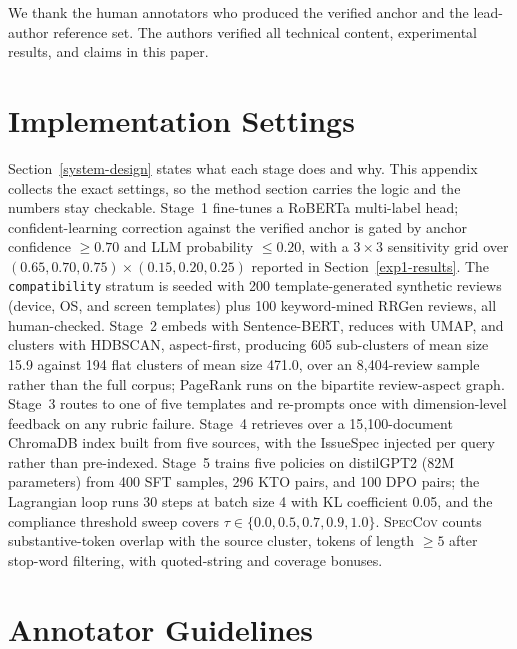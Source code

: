 \documentclass[sigconf, anonymous]{acmart}
\begin{document}
\begin{acks}
We thank the human annotators who produced the verified anchor and the lead-author reference set. The authors verified all technical content, experimental results, and claims in this paper.
\end{acks}



\appendix
  
  \section{Implementation Settings}\label{appendix:settings}

  Section~\ref{system-design} states what each stage does and why. This appendix collects the
  exact settings, so the method section carries the logic and the numbers stay checkable.
  Stage~1 fine-tunes a RoBERTa multi-label head; confident-learning correction against the
  verified anchor is gated by anchor confidence $\geq 0.70$ and LLM probability $\leq 0.20$,
  with a $3\times3$ sensitivity grid over $(0.65, 0.70, 0.75) \times (0.15, 0.20, 0.25)$
  reported in Section~\ref{exp1-results}. The \texttt{compatibility} stratum is seeded with 200
  template-generated synthetic reviews (device, OS, and screen templates) plus 100 keyword-mined
  RRGen reviews, all human-checked. Stage~2 embeds with Sentence-BERT, reduces with UMAP, and
  clusters with HDBSCAN, aspect-first, producing 605 sub-clusters of mean size 15.9 against 194
  flat clusters of mean size 471.0, over an 8{,}404-review sample rather than the full corpus; PageRank runs on the bipartite review-aspect graph. Stage~3
  routes to one of five templates and re-prompts once with dimension-level feedback on any
  rubric failure. Stage~4 retrieves over a 15{,}100-document ChromaDB index built from five
  sources, with the IssueSpec injected per query rather than pre-indexed. Stage~5 trains five
  policies on distilGPT2 (82M parameters) from 400 SFT samples, 296 KTO pairs, and 100 DPO
  pairs; the Lagrangian loop runs 30 steps at batch size 4 with KL coefficient 0.05, and the
  compliance threshold sweep covers $\tau \in \{0.0, 0.5, 0.7, 0.9, 1.0\}$.
  \textsc{SpecCov} counts substantive-token overlap with the source cluster, tokens of length
  $\geq 5$ after stop-word filtering, with quoted-string and coverage bonuses.

\section{Annotator Guidelines}\label{appendix:annotators}
\end{document}
